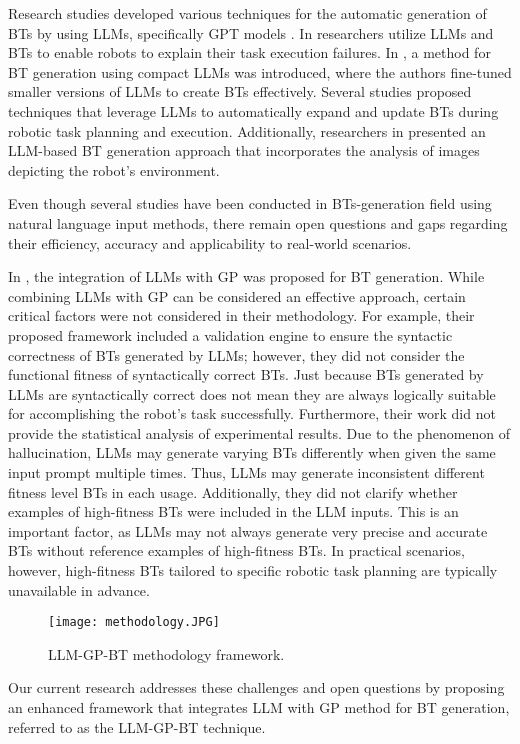 Research studies \cite{c9,c10,c11} developed various techniques for the automatic generation of BTs by using LLMs, specifically GPT models \cite{c33}. In \cite{c12} researchers utilize LLMs and BTs to enable robots to explain their task execution failures. In \cite{c13}, a method for BT generation using compact LLMs was introduced, where the authors fine-tuned smaller versions of LLMs to create BTs effectively. Several studies \cite{c14,c15,c16,c17} proposed techniques that leverage LLMs to automatically expand and update BTs during robotic task planning and execution. Additionally, researchers in \cite{c18,c19} presented an LLM-based BT generation approach that incorporates the analysis of images depicting the robot's environment. 

Even though several studies have been conducted in BTs-generation field using natural language input methods, there remain open questions and gaps regarding their efficiency, accuracy and applicability to real-world scenarios. 

In \cite{c8}, the integration of LLMs with GP was proposed for BT generation. While combining LLMs with GP can be considered an effective approach, certain critical factors were not considered in their methodology. For example, their proposed framework included a validation engine to ensure the syntactic correctness of BTs generated by LLMs; however, they did not consider the functional fitness of syntactically correct BTs. Just because BTs generated by LLMs are syntactically correct does not mean they are always logically suitable for accomplishing the robot's task successfully. Furthermore, their work did not provide the statistical analysis of experimental results. Due to the phenomenon of hallucination, LLMs may generate varying BTs differently when given the same input prompt multiple times. Thus, LLMs may generate inconsistent different fitness level BTs in each usage. Additionally, they did not clarify whether examples of high-fitness BTs were included in the LLM inputs. This is an important factor, as LLMs may not always generate very precise and accurate BTs without reference examples of high-fitness BTs. In practical scenarios, however, high-fitness BTs tailored to specific robotic task planning are typically unavailable in advance. 

\begin{figure*}[t]
    \centering
    \texttt{[image: methodology.JPG]} %
    \caption{LLM-GP-BT methodology framework.}
    \label{fig:example}
\end{figure*}

Our current research addresses these challenges and open questions by proposing an enhanced framework that integrates LLM with GP method for BT generation, referred to as the LLM-GP-BT technique.